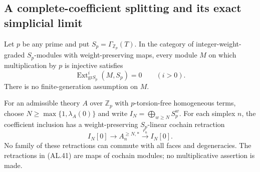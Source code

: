 \subsection{A complete-coefficient splitting and its exact simplicial limit}

\begin{proposition}
\label{AL08}
Let $p$ be any prime and put $S_p=\Gamma_{\mathbb Z_p}(T)$.
In the category of integer-weight-graded $S_p$-modules with
weight-preserving maps, every module $M$ on which multiplication
by $p$ is injective satisfies
\[
 \operatorname{Ext}^i_{\mathrm{gr}S_p}(M,S_p)=0
 \qquad(i>0).
 \tag{AL.40}
\]
There is no finite-generation assumption on $M$.

For an admissible theory $A$ over $\mathbb Z_p$ with
$p$-torsion-free homogeneous terms, choose
$N\geq\max\{1,\lambda_A(0)\}$ and write
$I_N=\bigoplus_{w\geq N}S_p^w$.
For each simplex $n$, the coefficient inclusion has a
weight-preserving $S_p$-linear cochain retraction
\[
 I_N[0]\longrightarrow A_n^{\geq N,*}
       \xrightarrow{\ r_n\ }I_N[0].
 \tag{AL.41}
\]
No family of these retractions can commute with all faces
and degeneracies.  The retractions in \textup{(AL.41)} are
maps of cochain modules; no multiplicative assertion is made.
\end{proposition}

